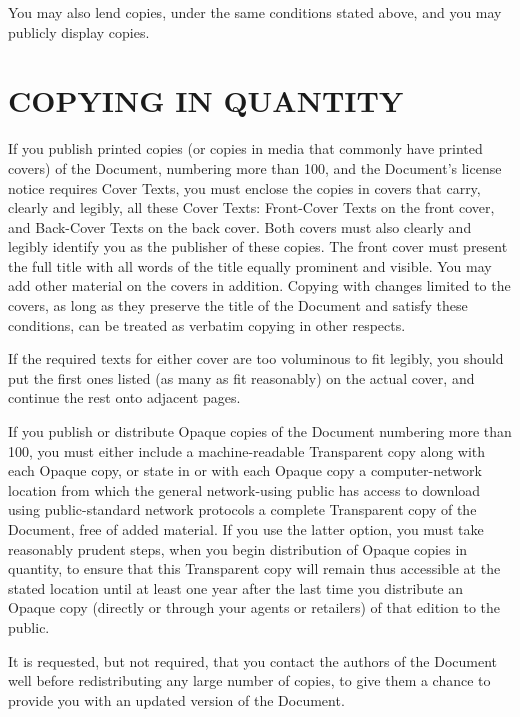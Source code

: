 You may also lend copies, under the same conditions stated
above, and you may publicly display copies.


\section{COPYING IN QUANTITY}
\label{gnu:copyinginquantity}
If you publish printed copies (or copies in media that commonly
have printed covers) of the Document, numbering more than 100,
and the Document\textquoteright s license notice requires Cover Texts,
you must enclose the copies in covers that carry, clearly and
legibly, all these Cover Texts: Front-Cover Texts on the front
cover, and Back-Cover Texts on the back cover. Both covers
must also clearly and legibly identify you as the publisher
of these copies. The front cover must present the full title
with all words of the title equally prominent and visible. You
may add other material on the covers in addition. Copying with
changes limited to the covers, as long as they preserve the
title of the Document and satisfy these conditions, can be
treated as verbatim copying in other respects.

If the required texts for either cover are too voluminous to
fit legibly, you should put the first ones listed (as many
as fit reasonably) on the actual cover, and continue the rest
onto adjacent pages.

If you publish or distribute Opaque copies of the
Document numbering more than 100, you must either include
a machine-readable Transparent copy along with each Opaque
copy, or state in or with each Opaque copy a computer-network
location from which the general network-using public has access
to download using public-standard network protocols a complete
Transparent copy of the Document, free of added material. If
you use the latter option, you must take reasonably prudent
steps, when you begin distribution of Opaque copies in
quantity, to ensure that this Transparent copy will remain
thus accessible at the stated location until at least one year
after the last time you distribute an Opaque copy (directly
or through your agents or retailers) of that edition to
the public.

It is requested, but not required, that you contact the authors
of the Document well before redistributing any large number of
copies, to give them a chance to provide you with an updated
version of the Document.


